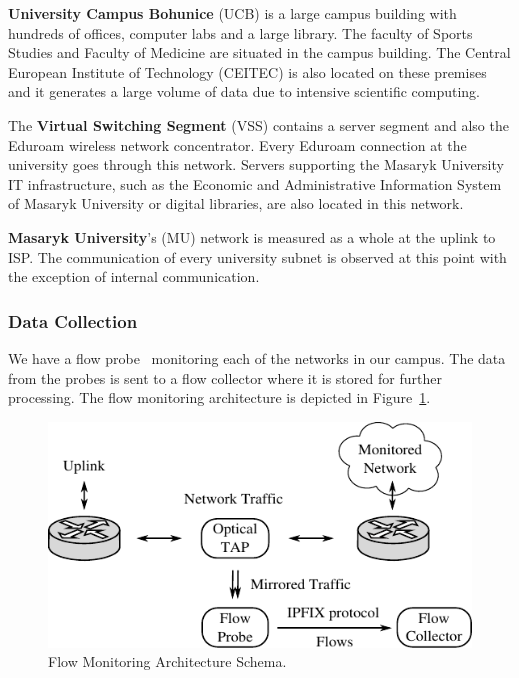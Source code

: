 \textbf{University Campus Bohunice} (UCB) is a large campus building with hundreds of offices, computer labs and a large library. The faculty of Sports Studies and Faculty of Medicine are situated in the campus building. The Central European Institute of Technology (CEITEC) is also located on these premises and it generates a large volume of data due to intensive scientific computing.

The \textbf{Virtual Switching Segment} (VSS) contains a server segment and also the Eduroam wireless network concentrator. Every Eduroam connection at the university goes through this network. Servers supporting the Masaryk University IT infrastructure, such as the Economic and Administrative Information System of Masaryk University or digital libraries, are also located in this network.

\textbf{Masaryk University}'s (MU) network is measured as a whole at the uplink to ISP. The communication of every university subnet is observed at this point with the exception of internal communication.

\subsubsection{Data Collection}

We have a flow probe~\cite{Hofstede-2014-Flow} monitoring each of the networks in our campus. The data from the probes is sent to a flow collector where it is stored for further processing. The flow monitoring architecture is depicted in Figure~\ref{fig:characterization-monitoring-architecture}.

\begin{figure}[!t]
        \begin{center}
                \includegraphics{figures/paper-characterization/monitoring_architecture}
                \caption{Flow Monitoring Architecture Schema.}
                \label{fig:characterization-monitoring-architecture}
        \end{center}
\end{figure}

